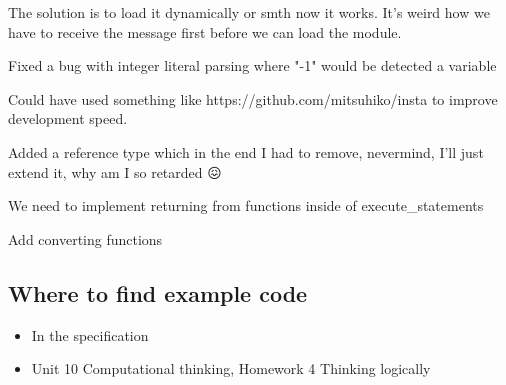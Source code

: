 \documentclass{article}
\begin{document}
The solution is to load it dynamically or smth now it works. It's weird how we
have to receive the message first before we can load the module.

Fixed a bug with integer literal parsing where "-1" would be detected a
variable

Could have used something like https://github.com/mitsuhiko/insta to improve
development speed.

Added a reference type which in the end I had to remove, nevermind, I'll just
extend it, why am I so retarded 😖

We need to implement returning from functions inside of execute\_statements

Add converting functions

\subsection{Where to find example code}

\begin{itemize}
	\item In the specification
	\item Unit 10 Computational thinking, Homework 4 Thinking logically
\end{itemize}

\printbibliography[heading=bibintoc]
\end{document}
